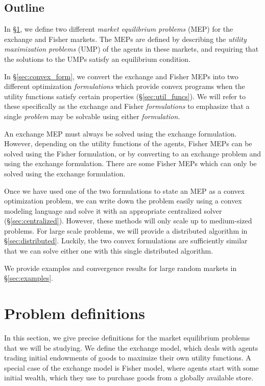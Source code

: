 \documentclass[12pt]{article}
\begin{document}
\subsection{Outline}

In \S\ref{sec:defs}, we define two different \emph{market equilibrium problems}
(MEP) for the exchange and Fisher markets. The MEPs are defined by describing
the \emph{utility maximization problems} (UMP) of the agents in these markets,
and requiring that the solutions to the UMPs satisfy an equilibrium condition.

In \S\ref{sec:convex_form}, we convert the exchange and Fisher MEPs into two
different optimization \emph{formulations} which provide convex programs when
the utility functions satisfy certain properties (\S\ref{sec:util_funcs}). We
will refer to these specifically as the exchange and Fisher \emph{formulations}
to emphasize that a single \emph{problem} may be solvable using either
\emph{formulation}.

An exchange MEP must always be solved using the exchange formulation. However,
depending on the utility functions of the agents, Fisher MEPs can be solved
using the Fisher formulation, or by converting to an exchange problem and using
the exchange formulation. There are some Fisher MEPs which can only be solved
using the exchange formulation.

Once we have used one of the two formulations to state an MEP as a convex
optimization problem, we can write down the problem easily using a convex
modeling language and solve it with an appropriate centralized solver
(\S\ref{sec:centralized}). However, these methods will only scale up to
medium-sized problems. For large scale problems, we will provide a distributed
algorithm in \S\ref{sec:distributed}. Luckily, the two convex formulations are
sufficiently similar that we can solve either one with this single distributed
algorithm.

We provide examples and convergence results for large random markets in
\S\ref{sec:examples}.


\section{Problem definitions}
\label{sec:defs}

In this section, we give precise definitions for the market equilibrium
problems that we will be studying. We define the exchange model, which deals
with agents trading initial endowments of goods to maximize their own utility
functions. A special case of the exchange model is Fisher model, where agents
start with some initial wealth, which they use to purchase goods  from a
globally available store.
\end{document}

